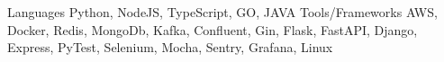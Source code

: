 \begin{cvskills}
  \cvskill
  {Languages}
  {Python, NodeJS, TypeScript, GO, JAVA}
  \cvskill
  {Tools/Frameworks}
  {AWS, Docker, Redis, MongoDb, Kafka, Confluent, Gin, Flask, FastAPI, Django, Express, PyTest, Selenium, Mocha, Sentry, Grafana, Linux}
\end{cvskills}